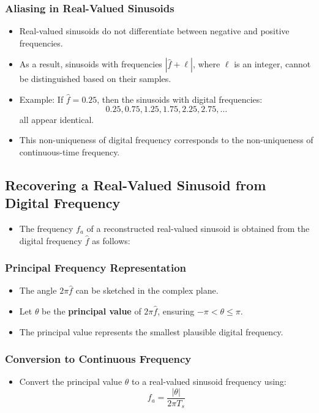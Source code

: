 \documentclass[12pt, letterpaper]{article}
\begin{document}
\subsubsection{Aliasing in Real-Valued Sinusoids}
\begin{itemize}
    \item Real-valued sinusoids do not differentiate between negative and positive frequencies.
    \item As a result, sinusoids with frequencies \( |\hat{f} + \ell| \), where \( \ell \) is an integer, cannot be distinguished based on their samples.
    \item Example: If \( \hat{f} = 0.25 \), then the sinusoids with digital frequencies:
    \[
    0.25, 0.75, 1.25, 1.75, 2.25, 2.75, \dots
    \]
    all appear identical.
    \item This non-uniqueness of digital frequency corresponds to the non-uniqueness of continuous-time frequency.
\end{itemize}

\subsection{Recovering a Real-Valued Sinusoid from Digital Frequency}
\begin{itemize}
    \item The frequency \( f_a \) of a reconstructed real-valued sinusoid is obtained from the digital frequency \( \hat{f} \) as follows:
\end{itemize}

\subsubsection{Principal Frequency Representation}
\begin{itemize}
    \item The angle \( 2\pi \hat{f} \) can be sketched in the complex plane.
    \item Let \( \theta \) be the \textbf{principal value} of \( 2\pi \hat{f} \), ensuring \( -\pi < \theta \leq \pi \).
    \item The principal value represents the smallest plausible digital frequency.
\end{itemize}

\subsubsection{Conversion to Continuous Frequency}
\begin{itemize}
    \item Convert the principal value \( \theta \) to a real-valued sinusoid frequency using:
    \[
    f_a = \frac{|\theta|}{2\pi T_s}
    \]
\end{itemize}
\end{document}
